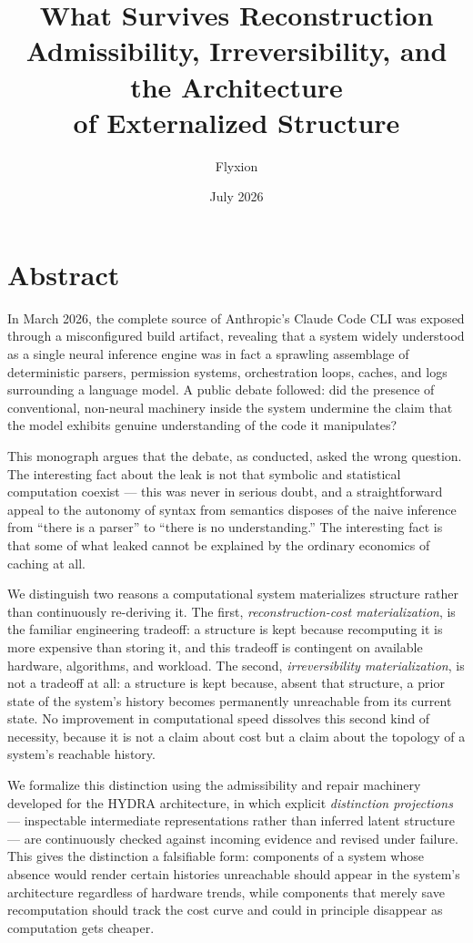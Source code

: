 \documentclass[11pt]{book}
\title{\Huge What Survives Reconstruction\\[0.4em]
\Large Admissibility, Irreversibility, and the Architecture\\ of Externalized Structure}
\author{Flyxion}
\date{July 2026}
\theoremstyle{plain}
\theoremstyle{definition}
\theoremstyle{remark}
\begin{document}
\frontmatter
\maketitle

\chapter*{Abstract}

In March 2026, the complete source of Anthropic's Claude Code CLI was
exposed through a misconfigured build artifact, revealing that a system
widely understood as a single neural inference engine was in fact a
sprawling assemblage of deterministic parsers, permission systems,
orchestration loops, caches, and logs surrounding a language model. A
public debate followed: did the presence of conventional, non-neural
machinery inside the system undermine the claim that the model exhibits
genuine understanding of the code it manipulates?

This monograph argues that the debate, as conducted, asked the wrong
question. The interesting fact about the leak is not that symbolic and
statistical computation coexist --- this was never in serious doubt, and
a straightforward appeal to the autonomy of syntax from semantics
disposes of the naive inference from ``there is a parser'' to ``there is
no understanding.'' The interesting fact is that some of what leaked
cannot be explained by the ordinary economics of caching at all.

We distinguish two reasons a computational system materializes
structure rather than continuously re-deriving it. The first,
\emph{reconstruction-cost materialization}, is the familiar
engineering tradeoff: a structure is kept because recomputing it is
more expensive than storing it, and this tradeoff is contingent on
available hardware, algorithms, and workload. The second,
\emph{irreversibility materialization}, is not a tradeoff at all: a
structure is kept because, absent that structure, a prior state of the
system's history becomes permanently unreachable from its current
state. No improvement in computational speed dissolves this second
kind of necessity, because it is not a claim about cost but a claim
about the topology of a system's reachable history.

We formalize this distinction using the admissibility and repair
machinery developed for the HYDRA architecture, in which explicit
\emph{distinction projections} --- inspectable intermediate
representations rather than inferred latent structure --- are
continuously checked against incoming evidence and revised under
failure. This gives the distinction a falsifiable form: components of
a system whose absence would render certain histories unreachable
should appear in the system's architecture regardless of hardware
trends, while components that merely save recomputation should track
the cost curve and could in principle disappear as computation gets
cheaper.
\end{document}
